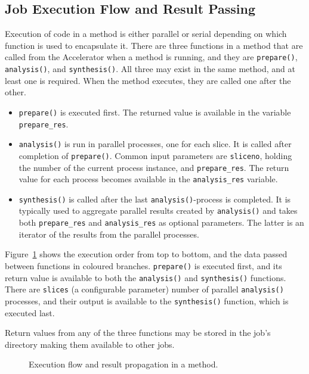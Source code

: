 


\subsection{Job Execution Flow and Result Passing}

Execution of code in a method is either parallel or serial depending
on which function is used to encapsulate it.  There are three
functions in a method that are called from the Accelerator when a
method is running, and they are \texttt{prepare()},
\texttt{analysis()}, and \texttt{synthesis()}.  All three may exist in
the same method, and at least one is required.  When the method
executes, they are called one after the other.
\begin{itemize}
\item[] \texttt{prepare()} is executed first.  The returned value is
  available in the variable \texttt{prepare\_res}.
\item[] \texttt{analysis()} is run in parallel processes, one for each
  slice.  It is called after completion of \texttt{prepare()}.  Common
  input parameters are \texttt{sliceno}, holding the number of the
  current process instance, and \texttt{prepare\_res}.  The return
  value for each process becomes available in the
  \texttt{analysis\_res} variable.
\item[] \texttt{synthesis()} is called after the last
  \texttt{analysis()}-process is completed.  It is typically used to
  aggregate parallel results created by \texttt{analysis()} and takes
  both \texttt{prepare\_res} and \texttt{analysis\_res} as optional
  parameters.  The latter is an iterator of the results from the
  parallel processes.
\end{itemize}
Figure~\ref{fig:prepanasyn} shows the execution order from top to
bottom, and the data passed between functions in coloured branches.
\texttt{prepare()} is executed first, and its return value is
available to both the \texttt{analysis()} and \texttt{synthesis()}
functions.  There are \texttt{slices} (a configurable parameter)
number of parallel \texttt{analysis()} processes, and their output is
available to the \texttt{synthesis()} function, which is executed
last.

Return values from any of the three functions may be stored in the
job's directory making them available to other jobs.


\begin{figure}[h!]
  \begin{center}
    
    \caption{Execution flow and result propagation in a method.}
    \label{fig:prepanasyn}
  \end{center}
\end{figure}



